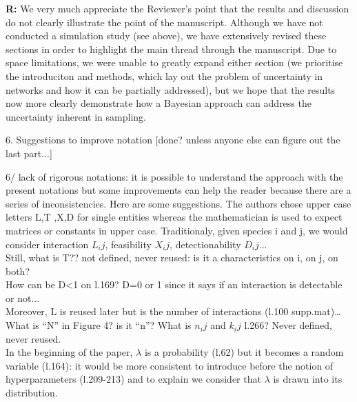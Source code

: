 \documentclass[12pt]{letter}
\newenvironment{refquote}{\bigskip \begin{it}}{\end{it}\smallskip}
\begin{document}
		\textbf{R:} We very much appreciate the Reviewer's point that the results and discussion do not clearly illustrate the point of the manuscript. Although we have not conducted a simulation study (see above), we have extensively revised these sections in order to highlight the main thread through the manuscript. Due to space limitations, we were unable to greatly expand either section (we prioritise the introduciton and methods, which lay out the problem of uncertainty in networks and how it can be partially addressed), but we hope that the results now more clearly demonstrate how a Bayesian approach can address the uncertainty inherent in sampling.


	6. Suggestions to improve notation [done? unless anyone else can figure out the last part...]


		\begin{refquote}
			6/ lack of rigorous notations: it is possible to understand the approach with the present notations but some improvements can help the reader because there are a series of inconsistencies. Here are some suggestions. The authors chose upper case letters L,T ,X,D for single entities whereas the mathematician is used to expect matrices or constants in upper case. Traditionaly, given species i and j, we would consider interaction $L_ij$, feasibility $X_ij$, detectionability $D_ij$... \\
			Still, what is T?? not defined, never reused: is it a characteristics on i, on j, on both? \\
			How can be D<1 on l.169? D=0 or 1 since it says if an interaction is detectable or not... \\
			Moreover, L is reused later but is the number of interactions (l.100 supp.mat)… \\
			What is “N” in Figure 4? is it “n”? What is $n_ij$ and $k_ij$ l.266? Never defined, never reused. \\
			In the beginning of the paper, $\lambda$ is a probability (l.62) but it becomes a random variable (l.164): it would be more consistent to introduce before the notion of hyperparameters  (l.209-213) and to explain we consider that $\lambda$ is drawn into its distribution.
		\end{refquote}
\end{document}
